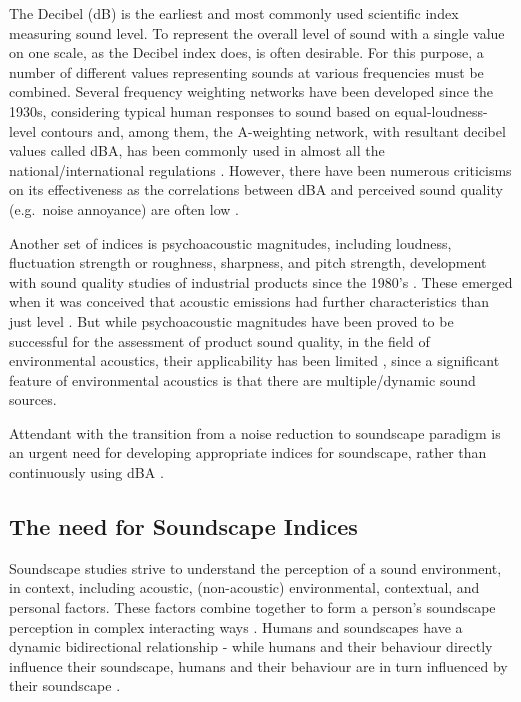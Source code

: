 \documentclass[
  authoryear,
  preprint,
  3p]{elsarticle}
\begin{document}
The Decibel (dB) is the earliest and most commonly used scientific index
measuring sound level. To represent the overall level of sound with a
single value on one scale, as the Decibel index does, is often
desirable. For this purpose, a number of different values representing
sounds at various frequencies must be combined. Several frequency
weighting networks have been developed since the 1930s, considering
typical human responses to sound based on equal-loudness-level contours
\citep{Fletcher1933Loudness} and, among them, the A-weighting network,
with resultant decibel values called dBA, has been commonly used in
almost all the national/international regulations
\citep{Kryter1970Effects}. However, there have been numerous criticisms
on its effectiveness \citep{Parmanen2007weighted} as the correlations
between dBA and perceived sound quality (e.g.~noise annoyance) are often
low \citep{Hellman1987Why}.

Another set of indices is psychoacoustic magnitudes, including loudness,
fluctuation strength or roughness, sharpness, and pitch strength,
development with sound quality studies of industrial products since the
1980's \citep{Zwicker2007Psychoacoustics}. These emerged when it was
conceived that acoustic emissions had further characteristics than just
level \citep{Blauert1997Sound}. But while psychoacoustic magnitudes have
been proved to be successful for the assessment of product sound
quality, in the field of environmental acoustics, their applicability
has been limited \citep{Fastl2006Psychoacoustic}, since a significant
feature of environmental acoustics is that there are multiple/dynamic
sound sources.

Attendant with the transition from a noise reduction to soundscape
paradigm is an urgent need for developing appropriate indices for
soundscape, rather than continuously using dBA
\citep{Andringa2013Positioning}.

\subsection{The need for Soundscape
Indices}\label{the-need-for-soundscape-indices}

Soundscape studies strive to understand the perception of a sound
environment, in context, including acoustic, (non-acoustic)
environmental, contextual, and personal factors. These factors combine
together to form a person's soundscape perception in complex interacting
ways \citep{Berglund2006Soundscape}. Humans and soundscapes have a
dynamic bidirectional relationship - while humans and their behaviour
directly influence their soundscape, humans and their behaviour are in
turn influenced by their soundscape
\citep{Erfanian2019Psychophysiological}.
\end{document}
